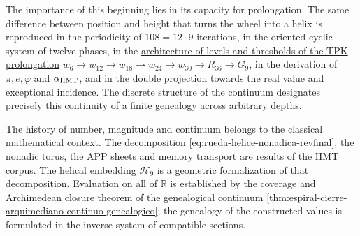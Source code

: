 The importance of this beginning lies in its capacity for prolongation. The
same difference between position and height that turns the wheel into a helix is
reproduced in the periodicity of \(108=12\cdot9\) iterations, in the oriented
cyclic system of twelve phases, in the
\hyperref[sec:umbrales-prolongacion-tpk-inaugural]{architecture of levels and
thresholds of the TPK prolongation}
\(w_6\to w_{12}\to w_{18}\to w_{24}\to w_{30}\to R_{36}\to G_9\), in the derivation of
\(\pi,e,\varphi\) and \(\alpha_{\rm HMT}\), and in the double projection towards the
real value and exceptional incidence. The discrete structure of the continuum
designates precisely this continuity of a finite genealogy across
arbitrary depths.

\begin{statusbox}
The history of number, magnitude and continuum belongs to the classical mathematical
context. The decomposition \eqref{eq:rueda-helice-nonadica-revfinal}, the nonadic
torus, the APP sheets and memory transport are results of the
HMT corpus. The helical embedding \(\mathcal H_9\) is a geometric
formalization of that decomposition. Evaluation on all of \(\mathbb R\)
is established by the coverage and Archimedean closure theorem of the
genealogical continuum
\cref{thm:espiral-cierre-arquimediano-continuo-genealogico}; the genealogy of
the constructed values is formulated in the inverse system of compatible
sections.
\end{statusbox}
